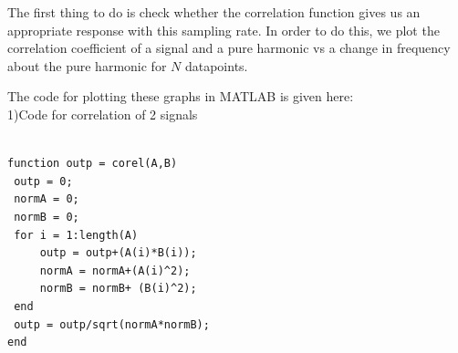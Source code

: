 The first thing to do is check whether the correlation function gives us an appropriate response with this sampling rate. In order to do this, we plot the correlation coefficient of a signal and a pure harmonic vs a change in frequency about the pure harmonic for \(N\) datapoints. 

The code for plotting these graphs in MATLAB is given here: \\
1)Code for correlation of 2 signals
\begin{lstlisting}
    
function outp = corel(A,B)
 outp = 0;
 normA = 0;
 normB = 0;
 for i = 1:length(A)
     outp = outp+(A(i)*B(i));
     normA = normA+(A(i)^2);
     normB = normB+ (B(i)^2);
 end
 outp = outp/sqrt(normA*normB);
end
\end{lstlisting} 

